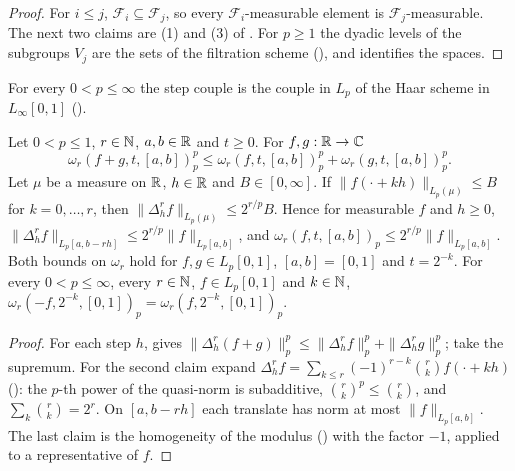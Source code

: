 \begin{proof}
\leanok
For $i \leq j$, $\mathcal{F}_i \subseteq \mathcal{F}_j$, so every $\mathcal{F}_i$-measurable
element is $\mathcal{F}_j$-measurable. The next two claims are (1) and (3) of
. For $p \geq 1$ the dyadic levels of the subgroups $V_j$ are the sets
of the filtration scheme (), and 
identifies the spaces.
\end{proof}

For every $0 < p \leq \infty$ the step couple is the couple in $L_p$ of the Haar scheme in
$L_\infty[0, 1]$ ().

\begin{lemma}
\label{lem:modulus-below-one}
\leanok
{}
Let $0 < p \leq 1$, $r \in \mathbb{N}$, $a, b \in \mathbb{R}$ and $t \geq 0$. For $f, g : \mathbb{R} \to \mathbb{C}$
\[
  \omega_r(f + g, t, [a, b])_p^p \leq \omega_r(f, t, [a, b])_p^p + \omega_r(g, t, [a, b])_p^p .
\]
Let $\mu$ be a measure on $\mathbb{R}$, $h \in \mathbb{R}$ and $B \in [0, \infty]$. If
$\|f(\cdot + kh)\|_{L_p(\mu)} \leq B$ for $k = 0, \dots, r$, then
$\|\Delta_h^r f\|_{L_p(\mu)} \leq 2^{r/p} B$. Hence for measurable $f$ and $h \geq 0$,
$\|\Delta_h^r f\|_{L_p[a, b - rh]} \leq 2^{r/p} \|f\|_{L_p[a, b]}$, and
$\omega_r(f, t, [a, b])_p \leq 2^{r/p} \|f\|_{L_p[a, b]}$. Both bounds on $\omega_r$ hold for
$f, g \in L_p[0, 1]$, $[a, b] = [0, 1]$ and $t = 2^{-k}$. For every $0 < p \leq \infty$, every
$r \in \mathbb{N}$, $f \in L_p[0, 1]$ and $k \in \mathbb{N}$,
$\omega_r(-f, 2^{-k}, [0, 1])_p = \omega_r(f, 2^{-k}, [0, 1])_p$.
\end{lemma}

\begin{proof}
\leanok
For each step $h$,  gives
$\|\Delta_h^r (f + g)\|_p^p \leq \|\Delta_h^r f\|_p^p + \|\Delta_h^r g\|_p^p$; take the supremum.
For the second claim expand $\Delta_h^r f = \sum_{k \leq r} (-1)^{r-k} \binom{r}{k} f(\cdot + kh)$
(): the $p$-th power of the quasi-norm is subadditive,
$\binom{r}{k}^p \leq \binom{r}{k}$, and $\sum_k \binom{r}{k} = 2^r$. On $[a, b - rh]$ each
translate has norm at most $\|f\|_{L_p[a, b]}$. The last claim is the homogeneity of the modulus
() with the factor $-1$, applied to a representative of $f$.
\end{proof}

